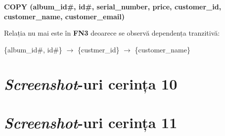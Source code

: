 \documentclass[a4paper, oneside, 12pt]{article}
\begin{document}
\begin{m_itemize}[after=]
        \item \textbf{COPY (album\_id\#, id\#, serial\_number, price, customer\_id, customer\_name, customer\_email)}
\end{m_itemize}

Relația nu mai este în \textbf{FN3} deoarece se observă dependența tranzitivă:
\begin{m_itemize}
\item \{album\_id\#, id\#\} $\rightarrow$ \{custmer\_id\} $\rightarrow$ \{customer\_name\}
\end{m_itemize}

\newpage

\appendix
\section{\emph{Screenshot}-uri cerința 10}
\label{screengenins}



\bigskip



\bigskip



\bigskip



\bigskip



\bigskip



\bigskip



\bigskip



\bigskip



\bigskip



\bigskip



\bigskip



\bigskip



\section{\emph{Screenshot}-uri cerința 11}
\end{document}
